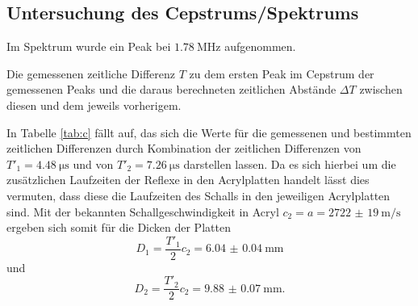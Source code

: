 \subsection{Untersuchung des Cepstrums/Spektrums}
Im Spektrum wurde ein Peak bei $\SI{1.78}{\mega\hertz}$ aufgenommen.
\begin{table}
	\centering
	\caption{Die gemessenen zeitliche Differenz $T$ zu dem ersten Peak im Cepstrum der gemessenen Peaks und die daraus berechneten zeitlichen Abstände $\Delta T$ zwischen diesen und dem jeweils vorherigem.}
	
\end{table}
In Tabelle \ref{tab:c} fällt auf, das sich die Werte für die gemessenen und bestimmten zeitlichen Differenzen durch Kombination der zeitlichen Differenzen von $T'_1=\SI{4.48}{\micro\second}$ und von $T'_2=\SI{7.26}{\micro\second}$ darstellen lassen. Da es sich hierbei um die zusätzlichen Laufzeiten der Reflexe in den Acrylplatten handelt lässt dies vermuten, dass diese die Laufzeiten des Schalls in den jeweiligen Acrylplatten sind.
Mit der bekannten Schallgeschwindigkeit in Acryl $c_2=a=\SI{2722(19)}{\meter\per\second}$ ergeben sich somit für die Dicken der Platten
\begin{equation}
D_1=\frac{T'_1}{2} c_2=\SI{6.04(4)}{\milli\meter}
\end{equation}
und
\begin{equation}
D_2=\frac{T'_2}{2} c_2=\SI{9.88(7)}{\milli\meter}\text{.}
\end{equation}


